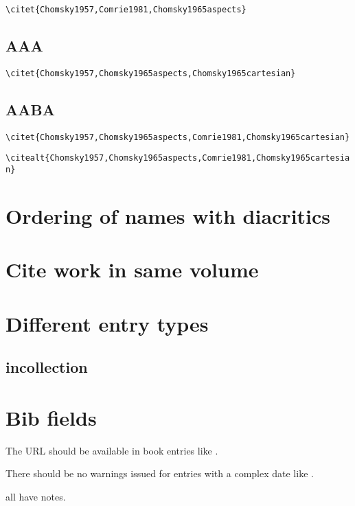        \citet{Chomsky1957}            


\bigskip
\verb+\citet{Chomsky1957,Comrie1981,Chomsky1965aspects}+

       \citet{Chomsky1957,Comrie1981,Chomsky1965aspects} 

 
 
\subsection{AAA} 

\bigskip
\verb+\citet{Chomsky1957,Chomsky1965aspects,Chomsky1965cartesian}+

       \citet{Chomsky1957,Chomsky1965aspects,Chomsky1965cartesian} 
 
\subsection{AABA} 
\bigskip
\verb+\citet{Chomsky1957,Chomsky1965aspects,Comrie1981,Chomsky1965cartesian}+

       \citet{Chomsky1957,Chomsky1965aspects,Comrie1981,Chomsky1965cartesian} 
\bigskip
\verb+\citealt{Chomsky1957,Chomsky1965aspects,Comrie1981,Chomsky1965cartesian}+

       \citealt{Chomsky1957,Chomsky1965aspects,Comrie1981,Chomsky1965cartesian} 

 
\section{Ordering of names with diacritics} 
\citet{Circov1900,MeierCircovac1900}

\section{Cite work in same volume}




\section{Different entry types}
\subsection{incollection}
\citet{Meier2000}

\section{Bib fields}

The URL should be available in book entries like \citet{Url2001}.

There should be no warnings issued for entries with a complex date like \citet{ComplexYear2000}.

\citet{
bookwithnote,
articlewithnote,
incollectionwithnote,
inproceedingsnwithnote,
miscwithnote,
websitewithnote,
electronicwithnote,
unpublishedwithnote, 
inbookwithnote} all have notes.